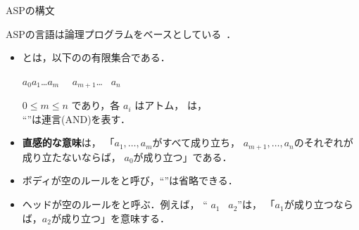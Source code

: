 \documentclass[dvipdfmx, 11pt]{beamer}
\begin{document}
\begin{frame}{ASPの構文}
  \begin{alertblock}{}\centering
    ASPの言語は論理プログラムをベースとしている~\footnotemark．
  \end{alertblock}
  \begin{itemize}
  \item {}とは，以下のの有限集合である．
    \begin{center}
      \begin{minipage}[c]{0.7\textwidth}
        \begin{block}{}\centering
          $a_0$\quad\code{:-}\quad$a_1$\code{,}\ldots\code{,}$a_m$\code{,}
          \ ~$a_{m+1}$\code{,}\ldots\code{,} ~$a_n$
        \end{block}        
      \end{minipage}
   \end{center}\vfill
    $0 \leq m \leq n$ であり，各 $a_i$ はアトム，
    は，\\
    ``\code{,}''は連言(AND)を表す．
  \item \alert{\bf 直感的な意味}は，
    「$a_1,\ldots,a_m$がすべて成り立ち，
    $a_{m+1},\ldots,a_n$のそれぞれが成り立たないならば，
    $a_0$が成り立つ」である．
  \item ボディが空のルールをと呼び，``\code{:-}''は省略できる．
  \item ヘッドが空のルールをと呼ぶ．例えば，
    ``\code{:-} $a_1$\code{,} ~$a_{2}$''は，
    「$a_1$が成り立つならば，$a_2$が成り立つ」を意味する．
  \end{itemize}
\end{frame}
\end{document}
